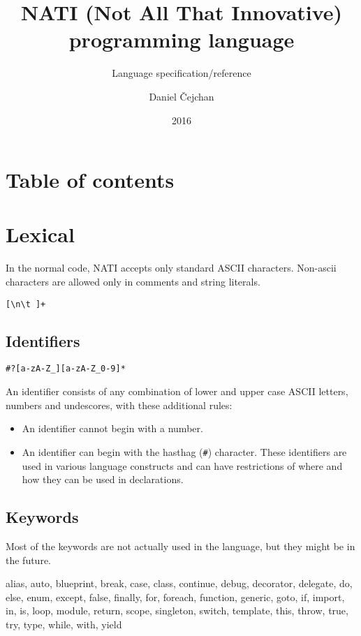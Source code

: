 




\setlength\extrarowheight{2pt}

\title{NATI (Not All That Innovative) programming language}
\subtitle{Language specification/reference}
\author{Daniel Čejchan}
\date{2016}



\mainpage

\chapter{Table of contents}
\makeatletter
{}
\makeatother

\chapter{Lexical}
In the normal code, NATI accepts only standard ASCII characters. Non-ascii characters are allowed only in comments and string literals.

\begin{grammar}
	 \verb|[\n\t ]+|
\end{grammar}

\section{Identifiers}
\begin{grammar}
	 \verb|#?[a-zA-Z_][a-zA-Z_0-9]*|
\end{grammar}
An identifier consists of any combination of lower and upper case ASCII letters, numbers and undescores, with these additional rules:
\begin{itemize}
	\item An identifier cannot begin with a number.
	\item An identifier can begin with the hasthag (\verb|#|) character. These identifiers are used in various language constructs and can have restrictions of where and how they can be used in declarations.
\end{itemize}

\section{Keywords} \label{keywords}
Most of the keywords are not actually used in the language, but they might be in the future.
\begin{code}
alias, auto, blueprint, break, case, class, continue, debug, decorator, delegate, do, else, enum, except, false, finally, for, foreach, function, generic, goto, if, import, in, is, loop, module, return, scope, singleton, switch, template, this, throw, true, try, type, while, with, yield
\end{code}

